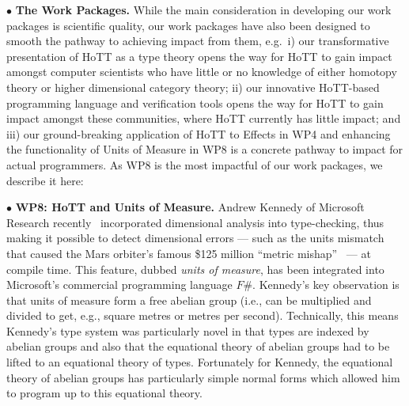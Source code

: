 \documentclass[a4paper,11pt]{article}
\begin{document}
\vspace*{0.02in}

$\bullet$ {\bf The Work Packages.} While the main consideration in
developing our work packages is scientific quality, our work
packages have also been designed to smooth the pathway to achieving
impact from them, e.g.\ i) our transformative presentation of HoTT as
a type theory opens the way for HoTT to gain impact
amongst computer scientists who have little or
no knowledge of either homotopy theory or higher dimensional category
theory; ii) our innovative HoTT-based programming language and
verification tools opens the way for HoTT to gain impact
amongst these communities, where HoTT currently has little impact; and
iii) our ground-breaking application of HoTT to Effects in WP4 and enhancing the
functionality of Units of Measure in WP8 is a concrete pathway to
impact for actual programmers. As WP8 is the most impactful of our
work packages, we describe it here:

\vspace*{0.02in}

$\bullet$ {\bf WP8: HoTT and Units of Measure.} Andrew Kennedy of
Microsoft Research recently~\cite{aknn97} incorporated dimensional
analysis into type-checking, thus making it possible to detect
dimensional errors --- such as the units mismatch that caused the Mars
orbiter's famous \$125 million ``metric mishap''~\cite{wp99} --- at
compile time. This feature, dubbed {\em units of measure}, has been
integrated into Microsoft's commercial programming language $F\#$.
Kennedy's key observation is that units of measure form a free abelian
group (i.e., can be multiplied and divided to get, e.g., square metres
or metres per second). Technically, this means Kennedy's type system
was particularly novel in that types are indexed by abelian groups and
also that the equational theory of abelian groups
had to be lifted to an equational theory of types. Fortunately for
Kennedy, the equational theory of abelian groups has particularly
simple normal forms which allowed him to program up to this equational
theory.
\end{document}
